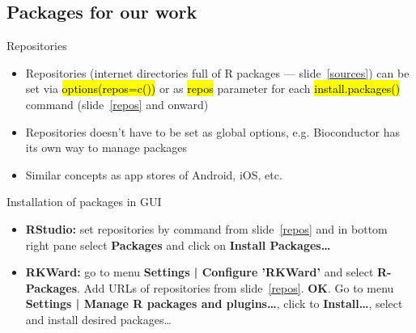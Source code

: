 \documentclass[compress, ucs, xelatex, 11pt, xcolor=svgnames,
	hyperref={
		bookmarks=true,
		unicode=true,
		colorlinks=true,
		pdftitle={Molecular data in R},
		plainpages=false,
		pdfauthor={Vojtech Zeisek},
		pdfsubject={Course about phylogeny and evolution in R},
		pdfcreator={XeLaTeX},
		pdfkeywords={R, evolution, phylogeny, molecular data},
		linkcolor=Tomato,
		anchorcolor=SaddleBrown,
		citecolor=Goldenrod,
		filecolor=DarkMagenta,
		menucolor=Sienna,
		urlcolor=DarkTurquoise,
		pdftex},
	url={hyphens, lowtilde} %
	]{beamer}
\renewcommand{\texttt}[1]{\hl{\ttfamily #1}}
\begin{document}
\subsection{Packages for our work}

\begin{frame}{Repositories}
	\begin{itemize}
		\item Repositories (internet directories full of R packages --- slide~\ref{sources}) can be set via \texttt{options(repos=c())} or as \texttt{repos} parameter for each \texttt{install.packages()} command (slide~\ref{repos} and onward)
		\item Repositories doesn't have to be set as global options, e.g. Bioconductor has its own way to manage packages
		\item Similar concepts as app stores of Android, iOS, etc.
	\end{itemize}
	\begin{block}{Installation of packages in GUI}
		\begin{itemize}
			\item \textbf{RStudio:} set repositories by command from slide~\ref{repos} and in bottom right pane select \textbf{Packages} and click on \textbf{Install Packages\ldots}
			\item \textbf{RKWard:} go to menu \textbf{Settings | Configure 'RKWard'} and select \textbf{R-Packages}. Add URLs of repositories from slide~\ref{repos}. \textbf{OK}. Go to menu \textbf{Settings | Manage R packages and plugins\ldots}, click to \textbf{Install\ldots}, select and install desired packages\ldots
		\end{itemize}
	\end{block}
\end{frame}
\end{document}
